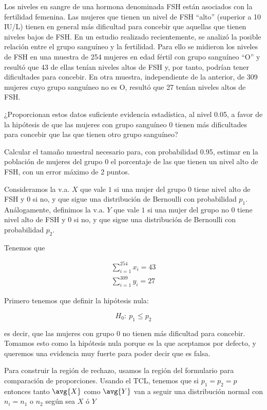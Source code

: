 \begin{problem}[4] Los niveles en sangre de una hormona denominada FSH están asociados con la fertilidad femenina. Las mujeres que tienen un nivel de FSH ``alto'' (superior a 10 IU/L) tienen en general más dificultad para concebir que aquellas que tienen niveles bajos de FSH. En un estudio realizado recientemente, se analizó la posible relación entre el grupo sanguíneo y la fertilidad. Para ello se midieron los niveles de FSH en una muestra de 254 mujeres en edad fértil con grupo sanguíneo ``O'' y resultó que 43 de ellas tenían niveles altos de FSH y, por tanto, podrían tener dificultades para concebir. En otra muestra, independiente de la anterior, de 309 mujeres cuyo grupo sanguíneo no es O, resultó que 27 tenían niveles altos de FSH. 

\ppart ¿Proporcionan estos datos suficiente evidencia estadística, al nivel 0.05, a favor de la hipótesis de que las mujeres con grupo sanguíneo 0 tienen más dificultades para concebir que las que tienen otro grupo sanguíneo?

\ppart Calcular el tamaño muestral necesario para, con probabilidad 0.95, estimar en la población de mujeres del grupo 0 el porcentaje de las que tienen un nivel alto de FSH, con un error máximo de 2 puntos.

\solution

Consideramos la v.a. $X$ que vale $1$ si una mujer del grupo 0 tiene nivel alto de FSH y 0 si no, y que sigue una distribución de Bernoulli con probabilidad $p_1$. Análogamente, definimos la v.a. $Y$ que vale $1$ si una mujer del grupo no 0 tiene nivel alto de FSH y 0 si no, y que sigue una distribución de Bernoulli con probabilidad $p_2$.

Tenemos que 

\begin{gather*}
\sum_{i=1}^{254} x_i = 43 \\
\sum_{i=1}^{309} y_i = 27 
\end{gather*}

\spart Primero tenemos que definir la hipótesis nula:

\[ H_0:\: p_1 \leq p_2 \]

es decir, que las mujeres con grupo 0 no tienen más dificultad para concebir. Tomamos esto como la hipótesis nula porque es la que aceptamos por defecto, y queremos una evidencia muy fuerte para poder decir que es falsa.

Para construir la región de rechazo, usamos la región del formulario para comparación de proporciones. Usando el TCL, tenemos que si $p_1=p_2=p$ entonces tanto $\avg{X}$ como $\avg{Y}$ van a seguir una distribución normal con $n_i = n_1$ o $n_2$ según sea $X$ ó $Y$


\end{problem}
